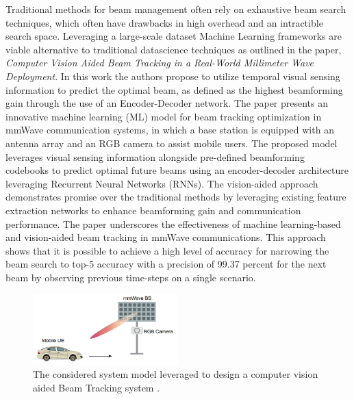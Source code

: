 Traditional methods for beam management often rely on exhaustive beam search techniques, which often have drawbacks in high overhead and an intractible search space. Leveraging a large-scale dataset Machine Learning frameworks are viable alternative to traditional datascience techniques as outlined in the paper, \textit{Computer Vision Aided Beam Tracking in a Real-World Millimeter Wave Deployment}. In this work the authors propose to utilize temporal visual sensing information to predict the optimal beam, as defined as the highest beamforming gain through the use of an Encoder-Decoder network. The paper presents an innovative machine learning (ML) model for beam tracking optimization in mmWave communication systems, in which a base station is equipped with an antenna array and an RGB camera to assist mobile users. The proposed model leverages visual sensing information alongside pre-defined beamforming codebooks to predict optimal future beams using an encoder-decoder architecture leveraging Recurrent Neural Networks (RNNs). The vision-aided approach demonstrates promise over the traditional methods by leveraging existing feature extraction networks to enhance beamforming gain and communication performance. \cite{jiang2022computer} The paper underscores the effectiveness of machine learning-based and vision-aided beam tracking in mmWave communications. This approach shows that it is possible to achieve a high level of accuracy for narrowing the beam search to top-5 accuracy with a precision of 99.37 percent for the next beam by observing previous time-steps on a single scenario.

\begin{figure}[h!]
  \centering
  \includegraphics[width=0.5\textwidth]{Images/Literature_Review/jiang2022computer_paper.png}
  \caption{The considered system model leveraged to design a computer vision aided Beam Tracking system \cite{jiang2022computer}.}
  \label{fig:my_label}
\end{figure}

